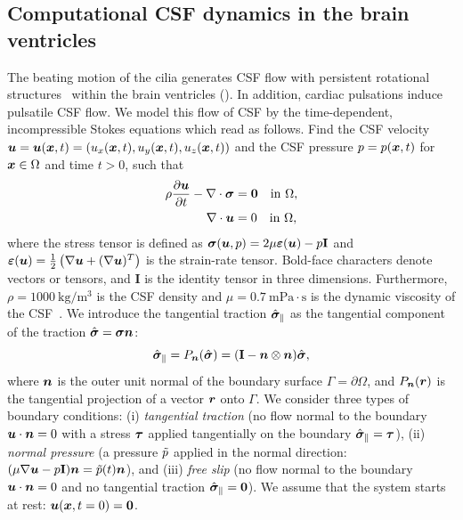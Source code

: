 \documentclass{WileyMSP-template}
\begin{document}
\subsection{Computational CSF dynamics in the brain ventricles}
The beating motion of the cilia generates CSF flow with persistent rotational
structures~\cite{Olstad2019CiliaryDevelopment}
within the brain ventricles ().
In addition, cardiac pulsations induce pulsatile CSF flow.
We model this flow of CSF by the time-dependent,
incompressible Stokes equations which read as follows.
Find the CSF velocity $\bm{u} = \bm{u}(\bm{x}, t) = (u_x(\bm{x}, t), u_y(\bm{x}, t), u_z(\bm{x}, t))$
and the CSF pressure $p = p(\bm{x}, t)$ for $\bm{x} \in \Omega$ and time $t>0$, such that
\begin{subequations}
    \begin{align}
      \rho \frac{\partial \bm{u}}{\partial t} - \nabla \cdot \bm{\sigma} &= \mathbf{0}
      \quad \text{in } \Omega,\\
      \nabla \cdot \bm{u} &= 0 
      \quad  \text{in } \Omega,\label{eq:stokes_eqs_cont} 
  \end{align}
  \label{eq:stokes_eqs}%
\end{subequations}%
where the stress tensor is defined as $\bm{\sigma}(\bm{u}, p) = 2\mu\bm{\varepsilon}(\bm{u}) - p\mathbf{I}$
and $\bm{\varepsilon}(\bm{u}) = \frac{1}{2}\left(\nabla \bm{u} + (\nabla\bm{u})^T\right)$ is the strain-rate tensor. 
Bold-face characters denote vectors or tensors, and $\mathbf{I}$ is the identity tensor in three dimensions.
Furthermore, $\rho=1000 \ \mathrm{kg/m^3}$ is the CSF density
and $\mu=0.7 \ \mathrm{mPa\cdot s}$ is the dynamic viscosity
of the CSF~\cite{Bloomfield1998EffectsFluid}.
We introduce the tangential traction $\hat{\bm{\sigma}}_{\parallel}$ as the
tangential component of the traction $\hat{\bm{\sigma}}=\bm{\sigma}\bm{n}$:
\begin{equation*}
    \hat{\bm{\sigma}}_{\parallel} = P_{\bm{n}}(\hat{\bm{\sigma}}) = (\mathbf{I} - \bm{n}\otimes\bm{n})\hat{\bm{\sigma}},
\end{equation*}
where $\bm{n}$ is the outer unit normal of the boundary surface $\Gamma = \partial\Omega$,
and $P_{\bm{n}}(\bm{r})$ is the tangential projection of a vector $\bm{r}$ onto $\Gamma$.
We consider three types of boundary conditions:
(i) \emph{tangential traction} (no flow normal to the boundary
$\bm{u} \cdot \bm{n} = 0$ with a stress $\bm{\tau}$ applied tangentially on the boundary $\hat{\bm{\sigma}}_{\parallel} = \bm{\tau}$),
(ii) \emph{normal pressure} (a pressure $\Tilde{p}$ applied in
the normal direction: $(\mu\nabla\bm{u} - p\mathbf{I})\bm{n} = \Tilde{p}(t)\bm{n}$),
and (iii) \emph{free slip} (no flow normal to the boundary
$\bm{u} \cdot \bm{n} = 0$ and no tangential traction $\hat{\bm{\sigma}}_{\parallel} = {\bf 0}$).
We assume that the system starts at rest: $\bm{u}(\bm{x}, t=0) = \mathbf{0}$.
\end{document}

